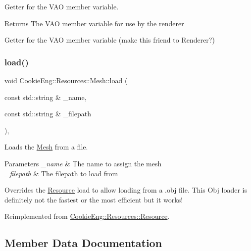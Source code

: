 Getter for the V\+AO member variable. 

\begin{DoxyReturn}{Returns}
The V\+AO member variable for use by the renderer
\end{DoxyReturn}
Getter for the V\+AO member variable (make this friend to Renderer?) \mbox{\label{struct_cookie_eng_1_1_resources_1_1_mesh_ae31053c6edaf0e735d85350bfa6093fb}} 
\subsubsection{\texorpdfstring{load()}{load()}}
{\footnotesize\ttfamily void Cookie\+Eng\+::\+Resources\+::\+Mesh\+::load (\begin{DoxyParamCaption}\item[{const std\+::string \&}]{\+\_\+name,  }\item[{const std\+::string \&}]{\+\_\+filepath }\end{DoxyParamCaption})\hspace{0.3cm}{\ttfamily [override]}, {\ttfamily [virtual]}}



Loads the \hyperlink{struct_cookie_eng_1_1_resources_1_1_mesh}{Mesh} from a file. 


\begin{DoxyParams}{Parameters}
{\em \+\_\+name} & The name to assign the mesh \\
\hline
{\em \+\_\+filepath} & The filepath to load from\\
\hline
\end{DoxyParams}
Overrides the \hyperlink{class_cookie_eng_1_1_resources_1_1_resource}{Resource} load to allow loading from a .obj file. This Obj loader is definitely not the fastest or the most efficient but it works! 

Reimplemented from \hyperlink{class_cookie_eng_1_1_resources_1_1_resource_a75648b8f2e442bebc90d6eb4ea3a2f6e}{Cookie\+Eng\+::\+Resources\+::\+Resource}.



\subsection{Member Data Documentation}
\mbox{\label{struct_cookie_eng_1_1_resources_1_1_mesh_aafc1b903c0858196d503b72056bd2f10}} 
